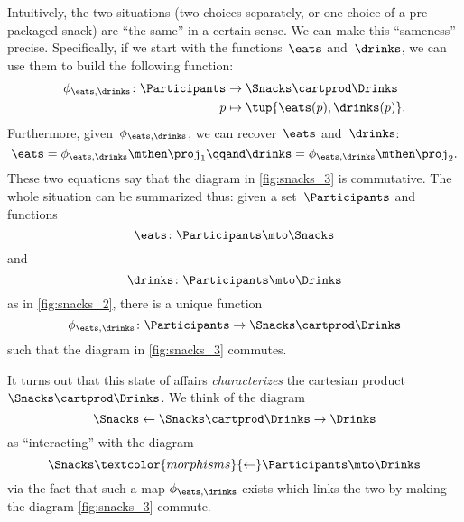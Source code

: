 Intuitively, the two situations (two choices separately, or one choice of a pre-packaged snack) are ``the same'' in a certain sense.
We can make this ``sameness'' precise.
Specifically, if we start with the functions~$\eats$ and~$\drinks$, we can use them to build the following function:
\begin{equation}
    \label{eq:snacks-building-univ-map}
    \begin{aligned}
        \phi_{\eats,\drinks}\colon \Participants & \to \Snacks\cartprod \Drinks \\
        p                                        & \mapsto \tup{\eats(p),\drinks(p)}.
    \end{aligned}
\end{equation}
Furthermore, given~$\phi_{\eats,\drinks}$, we can recover~$\eats$ and~$\drinks$:
\begin{equation}
    \label{eq:snacks-proj-univ-map}
    \eats =\phi_{\eats,\drinks}\mthen \proj_1 \qqand \drinks=\phi_{\eats,\drinks}\mthen \proj_2.
\end{equation}
These two equations say that the diagram in \cref{fig:snacks_3} is commutative.
The whole situation can be summarized thus: given a set~$\Participants$ and functions
\begin{equation}
    \eats\colon \Participants \mto \Snacks
\end{equation}
and
\begin{equation}
    \drinks\colon \Participants \mto \Drinks
\end{equation}
as in \cref{fig:snacks_2}, there is a unique function
\begin{equation}
    \label{eq:snacks-unique-univ-map}
    \phi_{\eats,\drinks} \colon \Participants \to \Snacks \cartprod \Drinks
\end{equation}
such that the diagram in \cref{fig:snacks_3} commutes.

\begin{figure*}[h!]
    \centering
    \caption{Choosing food and drink separately is essentially the same as choosing a combination of the two. }
    \label{fig:snacks_3}
\end{figure*}

It turns out that this state of affairs \emph{characterizes} the cartesian product $\Snacks\cartprod \Drinks$.
We think of the diagram
%
\begin{equation}
    \label{eq:snacks-prod-diagram}
    \Snacks \leftarrow \Snacks \cartprod \Drinks \rightarrow \Drinks
\end{equation}
as ``interacting'' with the diagram
\begin{equation}
    \label{eq:snacks-prod-test-diagram}
    \Snacks \textcolor{morphisms}{\leftarrow} \Participants \mto \Drinks
\end{equation}
via the fact that such a map $\phi_{\eats,\drinks}$ exists which links the two by making the diagram \cref{fig:snacks_3} commute.

